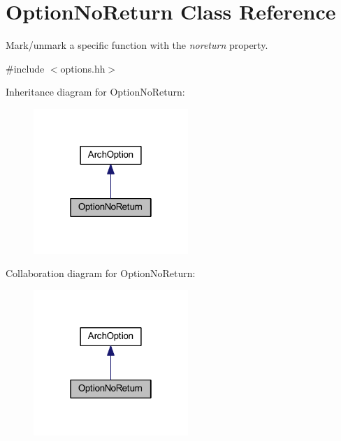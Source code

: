 \hypertarget{class_option_no_return}{}\section{Option\+No\+Return Class Reference}
\label{class_option_no_return}


Mark/unmark a specific function with the {\itshape noreturn} property.  




{\ttfamily \#include $<$options.\+hh$>$}



Inheritance diagram for Option\+No\+Return\+:
\nopagebreak
\begin{figure}[H]
\begin{center}
\leavevmode
\includegraphics[width=166pt]{class_option_no_return__inherit__graph}
\end{center}
\end{figure}


Collaboration diagram for Option\+No\+Return\+:
\nopagebreak
\begin{figure}[H]
\begin{center}
\leavevmode
\includegraphics[width=166pt]{class_option_no_return__coll__graph}
\end{center}
\end{figure}
